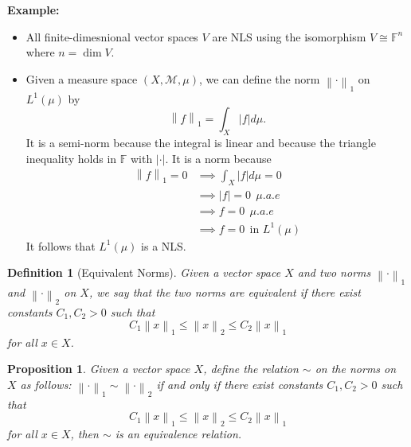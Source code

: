 \documentclass[12pt]{article}
\newtheorem*{proposition}{Proposition}
\newtheorem*{definition}{Definition}
\newcommand{\F}{\mathbb{F}}
\newcommand{\M}{\mathcal{M}}
\newcommand{\lnorm}[2]{\left\lVert#2 \right\rVert_{#1}}
\newcommand{\isomorphic}{\cong}
\newenvironment{example}{\noindent\textbf{Example:} \vspace{-0.2cm}\begin{itemize}}{\end{itemize}}
\begin{document}
\begin{example}
    \item All finite-dimesnional vector spaces $V$ are NLS using the isomorphism $V \isomorphic \F^n$ where $n = \dim V$.
    \item Given a measure space $(X, \M, \mu)$, we can define the norm $\lnorm{1}{\cdot}$ on $L^1(\mu)$ by
    $$\lnorm{1}{f} = \int_X |f| d\mu.$$
    It is a semi-norm because the integral is linear and because the triangle inequality holds in $\F$ with $|\cdot|$. It is a norm because
    \begin{align*}
        \lnorm{1}{f} = 0 &\implies \int_X |f| d\mu = 0 \\
        &\implies |f| = 0 \ \ \mu.a.e \\
        &\implies f = 0 \ \ \mu.a.e \\
        &\implies f = 0 \ \ \text{in } L^1(\mu)
    \end{align*}
    It follows that $L^1(\mu)$ is a NLS.
\end{example}

\begin{definition}[Equivalent Norms]
    Given a vector space $X$ and two norms $\lnorm{1}{\cdot}$ and $\lnorm{2}{\cdot}$ on $X$, we say that the two norms are equivalent if there exist constants $C_1, C_2 > 0$ such that 
    $$C_1 \lnorm{1}{x} \leq \lnorm{2}{x} \leq C_2 \lnorm{1}{x}$$
    for all $x \in X$.
\end{definition}

\begin{proposition}
    Given a vector space $X$, define the relation $\sim$ on the norms on $X$ as follows: $\lnorm{1}{\cdot} \sim \lnorm{2}{\cdot}$ if and only if there exist constants $C_1, C_2 > 0$ such that 
    $$C_1 \lnorm{1}{x} \leq \lnorm{2}{x} \leq C_2 \lnorm{1}{x}$$
    for all $x \in X$, then $\sim$ is an equivalence relation.
\end{proposition}
\end{document}
